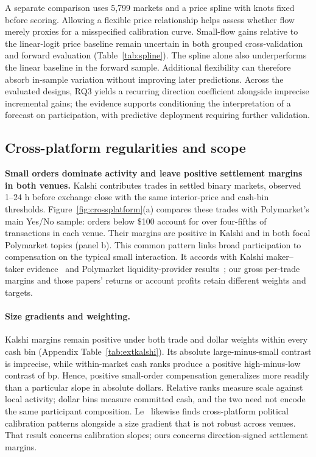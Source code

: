 \documentclass[sigconf,anonymous,nonacm,balance=false]{acmart}
\begin{document}
A separate comparison uses 5,799 markets and a price spline with knots fixed before scoring. Allowing a flexible price relationship helps assess whether flow merely proxies for a misspecified calibration curve. Small-flow gains relative to the linear-logit price baseline remain uncertain in both grouped cross-validation and forward evaluation (Table~\ref{tab:spline}). The spline alone also underperforms the linear baseline in the forward sample. Additional flexibility can therefore absorb in-sample variation without improving later predictions. Across the evaluated designs, RQ3 yields a recurring direction coefficient alongside imprecise incremental gains; the evidence supports conditioning the interpretation of a forecast on participation, with predictive deployment requiring further validation.

\subsection{Cross-platform regularities and scope}
\label{sec:kalshi}
\textbf{Small orders dominate activity and leave positive settlement margins in both venues.} Kalshi contributes \KalTrades{} trades in \KalMkts{} settled binary markets, observed 1--24 h before exchange close with the same interior-price and cash-bin thresholds. Figure~\ref{fig:crossplatform}(a) compares these trades with Polymarket's main Yes/No sample: orders below \$100 account for over four-fifths of transactions in each venue. Their margins are positive in Kalshi and in both focal Polymarket topics (panel b). This common pattern links broad participation to compensation on the typical small interaction. It accords with Kalshi maker--taker evidence~\cite{burgi2026makers,becker2026microstructure} and Polymarket liquidity-provider results~\cite{akey2026who}; our gross per-trade margins and those papers' returns or account profits retain different weights and targets.

\paragraph{Size gradients and weighting.}
Kalshi margins remain positive under both trade and dollar weights within every cash bin (Appendix Table~\ref{tab:extkalshi}). Its absolute large-minus-small contrast is imprecise, while within-market cash ranks produce a positive high-minus-low contrast of \KalRank{} bp. Hence, positive small-order compensation generalizes more readily than a particular slope in absolute dollars. Relative ranks measure scale against local activity; dollar bins measure committed cash, and the two need not encode the same participant composition. Le~\cite{le2026decomposing} likewise finds cross-platform political calibration patterns alongside a size gradient that is not robust across venues. That result concerns calibration slopes; ours concerns direction-signed settlement margins.
\end{document}
